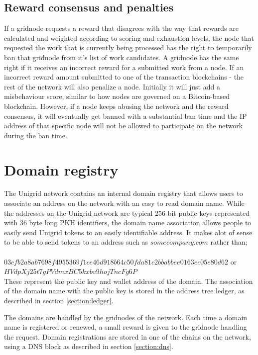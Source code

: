 \documentclass[10pt,a4paper,final]{article}
\begin{document}
\subsection{Reward consensus and penalties}
If a \gls{gridnode} requests a reward that disagrees with the way that rewards are calculated and weighted according to scoring and exhaustion levels, the node that requested the work that is currently being processed has the right to temporarily ban that \gls{gridnode} from it's list of work candidates. A \gls{gridnode} has the same right if it receives an incorrect reward for a submitted work from a node. If an incorrect reward amount submitted to one of the transaction blockchains - the rest of the network will also penalize a node. Initially it will just add a misbehaviour score, similar to how nodes are governed on a Bitcoin-based blockchain. However, if a node keeps abusing the network and the reward consensus, it will eventually get banned with a substantial ban time and the IP address of that specific node will not be allowed to participate on the network during the ban time.

\section{Domain registry}
\label{section:domain}
The Unigrid network contains an internal domain registry that allows users to associate an address on the network with an easy to read domain name. While the addresses on the Unigrid network are typical 256 bit public keys represented with 36 byte long PKH identifiers, the domain name association allows people to easily send Unigrid tokens to an easily identifiable address. It makes alot of sense to be able to send tokens to an address such as $somecompany.com$ rather than;
\\ \\
$03cfb2a8ab7698f4955369f1ce46d918b64c50fda81c2bbabbee0163ec05e80d62$ or\\
$HVdpXj25t7gPVdmxBC5kxbv9hojTncFg6P$\\

\noindent These represent the public key and wallet address of the domain. The association of the domain name with the public key is stored in the address tree ledger, as described in section \ref{section:ledger}.

The domains are handled by the \glspl{gridnode} of the network. Each time a domain name is registered or renewed, a small reward is given to the \gls{gridnode} handling the request. Domain registrations are stored in one of the chains on the network, using a DNS block as described in section \ref{section:dns}.
\end{document}
